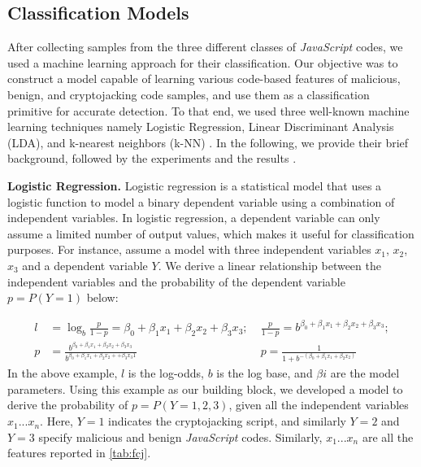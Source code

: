 \documentclass[acmlarge]{acmart}
\newcommand{\BfPara}[1]{{\noindent\bf#1.}\xspace\xspace}
\newcommand{\vs}[1]{{\vspace{-#1mm}}}
\newcommand{\js}{{\em JavaScript}\xspace}
\newcommand{\cj}{cryptojacking\xspace}
\begin{document}
\vs{0}
{\color{black}\subsection{Classification Models} \label{sec:clustering}
After collecting samples from the three different classes of \js codes, we used a machine learning approach for their classification. Our objective was to construct a model capable of learning various code-based features of malicious, benign, and \cj code samples, and use them as a classification primitive for accurate detection. To that end, we used three well-known machine learning techniques namely Logistic Regression, Linear Discriminant Analysis (LDA), and k-nearest neighbors (k-NN) \cite{LiuCY09,NikitidisZP14}.  In the following, we provide their brief background, followed by the experiments and the results . 

\BfPara{Logistic Regression} Logistic regression is a statistical model that uses a logistic function to model a binary dependent variable using a combination of independent variables. In logistic regression, a dependent variable can only assume a limited number of output values, which makes it useful for classification purposes. For instance, assume a model with three independent variables $x_{1}$, $x_{2}$,$x_{3}$ and a dependent variable $Y$. We derive a linear relationship between the independent variables and the probability of the dependent variable $p =P(Y=1)$ below:

\begin{align}
  \nonumber l &= \log _{b} \frac{p}{1-p}=\beta_{0}+\beta_{1} x_{1}+\beta_{2} x_{2} +\beta_{3} x_{3};\;
  &\frac{p}{1-p}=b^{\beta_{0}+\beta_{1} x_{1}+\beta_{2} x_{2} +\beta_{3} x_{3}}; \\
  \nonumber p &= \frac{b^{\beta_{0}+\beta_{1} x_{1}+\beta_{2} x_{2} + \beta_{3} x_{3}}}{b^{\beta_{0}+\beta_{1} x_{1}+\beta_{2} x_{2}+ +\beta_{3} x_{3}1}} & p= \frac{1}{1+b^{-\left(\beta_{0}+\beta_{1} x_{1}+\beta_{2} x_{2}\right)}}
\end{align}
In the above example, $l$ is the log-odds, $b$ is the log base, and $\beta{i}$ are the model parameters. Using this example as our building block, we developed a model to derive the probability of  $p = P(Y =1,2,3)$, given all the independent variables $x_{1}...x_{n}$. Here, $Y=1$ indicates the \cj script, and similarly $Y=2$ and $Y=3$ specify malicious and benign \js codes. Similarly, $x_{1}...x_{n}$ are all the features reported in \autoref{tab:fcj}. 

}
\end{document}
